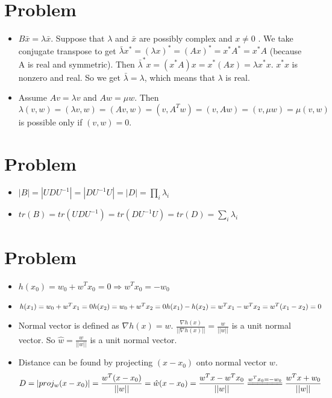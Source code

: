 \documentclass{article}
\begin{document}
	\section{Problem}
	\begin{itemize}
		\item $B \bar{x} = \lambda \bar{x} $. Suppose that $\lambda$ and $\bar{x}$ are possibly complex and  $x \not=0$  .
		We take conjugate transpose to get $\bar{\lambda} x^* = (\lambda x)^* = (Ax)^* =x^*A^* = x^*A$  (because A is real and symmetric). Then $\bar{\lambda}^*x = (x^*A)x = x^*(Ax) = \lambda x^*x$. $x^*x$ is nonzero and real. So we get $\bar{\lambda} = \lambda$, which means that $\lambda$ is real.
		\item Assume $Av =\lambda v$ and  $ Aw =\mu w$. Then  \[ \lambda(v, w) = (\lambda v, w) = (Av, w) = (v, A^T w) = (v, Aw) = (v, \mu w) = \mu (v, w) \] is possible only if $(v, w) = 0$.
	\end{itemize}
	
	\section{Problem}
	\begin{itemize}
		\item $ |B| =  |UDU^{-1}| = |DU^{-1}U| = |D| = \prod_i{\lambda_i} $
		\item $ tr(B) = tr(UDU^{-1}) = tr(DU^{-1}U) = tr(D) = \sum_i{\lambda_i} $
	\end{itemize}
	
	\section{Problem}
	\begin{itemize}
		\item $ h(x_0) = w_0 + w^T x_0 = 0 \Rightarrow w^T x_0 = -w_0 $
		\item $ h(x_1) = w_0 + w^T x_1 = 0 \\
		h(x_2) = w_0 + w^T x_2 = 0 \\
		h(x_1) - h(x_2) = w^T x_1 - w^T x_2 =  w^T (x_1 - x_2) = 0 $
		\item Normal vector is defined as $\nabla h(x) = w$. $ \frac{\nabla h(x)}{|| \nabla h(x)||} = \frac{w}{||w||}$ is a unit normal vector. So $ \hat{w} = \frac{w}{||w||}$ is a unit normal vector.
		\item Distance can be found by projecting $(x - x_0)$ onto normal vector $w$. \[ D = |proj_w(x-x_0)| =\frac{w^T (x - x_0)}{||w||} = \hat{w}(x-x_0) = \frac{w^T x - w^T x_0}{||w||}  \overset{w^T x_0 = -w_0}{= \joinrel = \joinrel = \joinrel = \joinrel = \joinrel = \joinrel =} \frac{w^T x + w_0}{||w||} \]
	\end{itemize}
	
\end{document}
